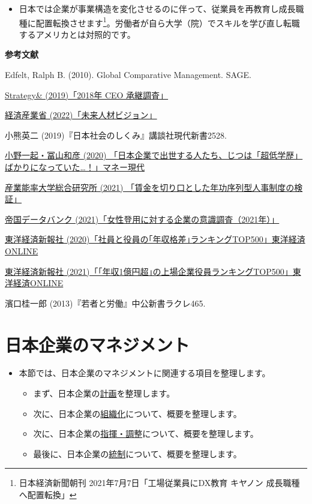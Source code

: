 \documentclass[
]{book}
\providecommand{\tightlist}{%
  \setlength{\itemsep}{0pt}\setlength{\parskip}{0pt}}
\begin{document}
\begin{itemize}
\tightlist
\item
  日本では企業が事業構造を変化させるのに伴って、従業員を再教育し成長職種に配置転換させます\footnote{日本経済新聞朝刊 2021年7月7日「工場従業員にDX教育 キヤノン 成長職種へ配置転換」}。労働者が自ら大学（院）でスキルを学び直し転職するアメリカとは対照的です。
\end{itemize}

{\textbf{参考文献}}

Edfelt, Ralph B. (2010). Global Comparative Management. SAGE.

\href{https://www.strategyand.pwc.com/jp/ja/publications/2018_ceo-data-media-release-jp.pdf}{Strategy\& (2019)「2018年 CEO 承継調査」}

\href{https://www.meti.go.jp/press/2022/05/20220531001/20220531001-1.pdf}{経済産業省 (2022)「未来人材ビジョン」}

小熊英二 (2019)『日本社会のしくみ』講談社現代新書2528.

\href{https://gendai.ismedia.jp/articles/-/71570?imp=0}{小野一起・冨山和彦 (2020) 「日本企業で出世する人たち、じつは「超低学歴」ばかりになっていた\ldots！」マネー現代}

\href{https://www.hj.sanno.ac.jp/cp/feature/201912/24-01.html}{産業能率大学総合研究所 (2021) 「賃金を切り口とした年功序列型人事制度の検証」}

\href{https://www.tdb.co.jp/report/watching/press/pdf/p210805.pdf}{帝国データバンク (2021)「女性登用に対する企業の意識調査（2021年）」}

\href{https://toyokeizai.net/articles/-/397196}{東洋経済新報社 (2020)「社員と役員の｢年収格差｣ランキングTOP500」東洋経済ONLINE}

\href{https://toyokeizai.net/articles/-/453483}{東洋経済新報社 (2021)「｢年収1億円超｣の上場企業役員ランキングTOP500」東洋経済ONLINE}

濱口桂一郎 (2013)『若者と労働』中公新書ラクレ465.

\hypertarget{japan-management}{%
\section{日本企業のマネジメント}\label{japan-management}}

\begin{itemize}
\item
  本節では、日本企業のマネジメントに関連する項目を整理します。

  \begin{itemize}
  \item
    まず、日本企業の\protect\hyperlink{japan-plan}{計画}を整理します。
  \item
    次に、日本企業の\protect\hyperlink{japan-organization}{組織化}について、概要を整理します。
  \item
    次に、日本企業の\protect\hyperlink{japan-command}{指揮・調整}について、概要を整理します。
  \item
    最後に、日本企業の\protect\hyperlink{japan-control}{統制}について、概要を整理します。
  \end{itemize}
\end{itemize}
\end{document}
